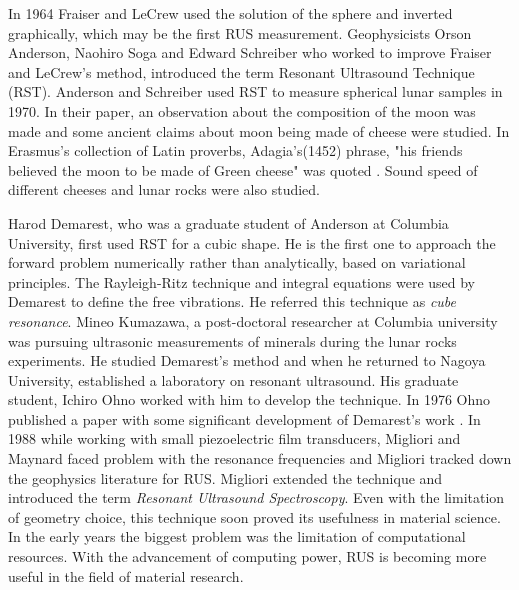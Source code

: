 \begin{doublespacing}
In 1964 Fraiser and LeCrew \cite{fraser1964novel} used the solution of the sphere and inverted graphically, which may be the first RUS measurement. Geophysicists Orson Anderson, Naohiro Soga and Edward Schreiber who worked to improve Fraiser and LeCrew's method, introduced the term Resonant Ultrasound Technique (RST). Anderson and Schreiber used RST to measure spherical lunar samples in 1970. In their paper,  an observation about the composition of the moon was made and some ancient claims about moon being made of cheese were studied. In Erasmus's collection of Latin proverbs, Adagia's(1452) phrase, "his friends believed the moon to be made of Green cheese" was quoted \cite{anderson1970elastic}. Sound speed of different cheeses and lunar rocks were also studied.

Harod Demarest, who was a graduate student of Anderson at Columbia University, first used RST for a cubic shape.  He is the first one to approach the forward problem numerically rather than analytically, based on variational principles. The Rayleigh-Ritz technique and integral equations were used by Demarest  to define  the free vibrations.  He referred this technique as \emph{cube resonance}. Mineo Kumazawa, a post-doctoral researcher at Columbia university was pursuing ultrasonic measurements of minerals during the lunar rocks experiments. He studied Demarest's method and when he returned to Nagoya University, established a laboratory on resonant ultrasound.  His graduate student, Ichiro Ohno worked with him to develop the technique. In 1976 Ohno published a paper with some significant development of Demarest's work \cite{ohno1976free}. In 1988 while working with small piezoelectric film transducers, Migliori and Maynard faced problem with the resonance frequencies and Migliori tracked down the geophysics literature for RUS. Migliori extended the technique and introduced the term \emph{Resonant Ultrasound Spectroscopy}. Even with the limitation of geometry choice, this technique soon proved its usefulness in material science. In the early years the biggest problem was the limitation of computational resources. With the advancement of computing power, RUS is becoming more useful in the field of material research.




\end{doublespacing}



